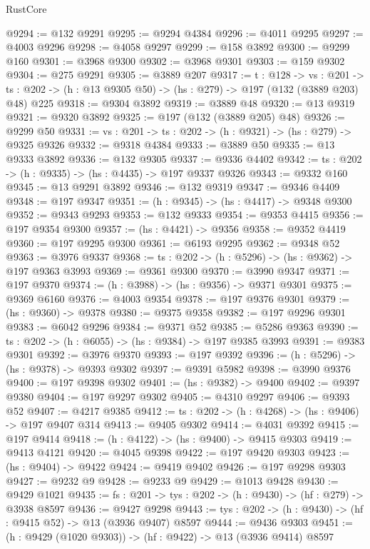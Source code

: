 \begin{lexlean}{RustCore}
\begin{coremodule}
@9294 := @132 @9291
@9295 := @9294 @4384
@9296 := @4011 @9295
@9297 := @4003 @9296
@9298 := @4058 @9297
@9299 := @158 @3892
@9300 := @9299 @160
@9301 := @3968 @9300
@9302 := @3968 @9301
@9303 := @159 @9302
@9304 := @275 @9291
@9305 := @3889 @207
@9317 := {t : @128} ->
  {vs : @201} ->
  {ts : @202} -> (h : @13 @9305 @50) -> (hs : @279) -> @197 (@132 (@3889 @203) @48) @225
@9318 := @9304 @3892
@9319 := @3889 @48
@9320 := @13 @9319
@9321 := @9320 @3892
@9325 := @197 (@132 (@3889 @205) @48)
@9326 := @9299 @50
@9331 := {vs : @201} -> {ts : @202} -> (h : @9321) -> (hs : @279) -> @9325 @9326
@9332 := @9318 @4384
@9333 := @3889 @50
@9335 := @13 @9333 @3892
@9336 := @132 @9305
@9337 := @9336 @4402
@9342 := {ts : @202} -> (h : @9335) -> (hs : @4435) -> @197 @9337 @9326
@9343 := @9332 @160
@9345 := @13 @9291 @3892
@9346 := @132 @9319
@9347 := @9346 @4409
@9348 := @197 @9347
@9351 := (h : @9345) -> (hs : @4417) -> @9348 @9300
@9352 := @9343 @9293
@9353 := @132 @9333
@9354 := @9353 @4415
@9356 := @197 @9354 @9300
@9357 := (hs : @4421) -> @9356
@9358 := @9352 @4419
@9360 := @197 @9295 @9300
@9361 := @6193 @9295
@9362 := @9348 @52
@9363 := @3976 @9337
@9368 := {ts : @202} -> (h : @5296) -> (hs : @9362) -> @197 @9363 @3993
@9369 := @9361 @9300
@9370 := @3990 @9347
@9371 := @197 @9370
@9374 := (h : @3988) -> (hs : @9356) -> @9371 @9301
@9375 := @9369 @6160
@9376 := @4003 @9354
@9378 := @197 @9376 @9301
@9379 := (hs : @9360) -> @9378
@9380 := @9375 @9358
@9382 := @197 @9296 @9301
@9383 := @6042 @9296
@9384 := @9371 @52
@9385 := @5286 @9363
@9390 := {ts : @202} -> (h : @6055) -> (hs : @9384) -> @197 @9385 @3993
@9391 := @9383 @9301
@9392 := @3976 @9370
@9393 := @197 @9392
@9396 := (h : @5296) -> (hs : @9378) -> @9393 @9302
@9397 := @9391 @5982
@9398 := @3990 @9376
@9400 := @197 @9398 @9302
@9401 := (hs : @9382) -> @9400
@9402 := @9397 @9380
@9404 := @197 @9297 @9302
@9405 := @4310 @9297
@9406 := @9393 @52
@9407 := @4217 @9385
@9412 := {ts : @202} -> (h : @4268) -> (hs : @9406) -> @197 @9407 @314
@9413 := @9405 @9302
@9414 := @4031 @9392
@9415 := @197 @9414
@9418 := (h : @4122) -> (hs : @9400) -> @9415 @9303
@9419 := @9413 @4121
@9420 := @4045 @9398
@9422 := @197 @9420 @9303
@9423 := (hs : @9404) -> @9422
@9424 := @9419 @9402
@9426 := @197 @9298 @9303
@9427 := @9232 @9
@9428 := @9233 @9
@9429 := @1013 @9428
@9430 := @9429 @1021
@9435 := {fs : @201} -> {tys : @202} -> (h : @9430) -> (hf : @279) -> @3938 @8597
@9436 := @9427 @9298
@9443 := {tys : @202} -> (h : @9430) -> (hf : @9415 @52) -> @13 (@3936 @9407) @8597
@9444 := @9436 @9303
@9451 := (h : @9429 (@1020 @9303)) -> (hf : @9422) -> @13 (@3936 @9414) @8597

\end{coremodule}
\end{lexlean}
